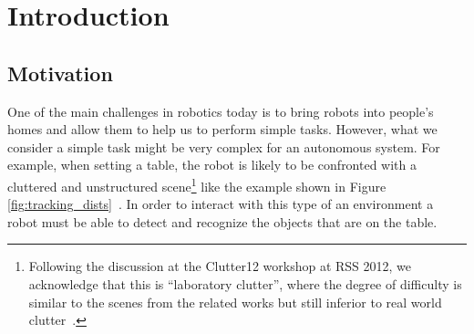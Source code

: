\chapter{Introduction}
\label{chapter:Introduction}


 
\section{Motivation}
\label{sec:intro}
One of the main challenges in robotics today is to bring robots into people's homes and allow them to help us to perform simple tasks. However, what we consider a simple task might be very complex for an autonomous system. For example, when setting a table, the robot is likely to be
confronted with a cluttered and unstructured scene\footnote{Following the discussion at the Clutter12
workshop at RSS 2012, we acknowledge that this is ``laboratory clutter'', where the degree of difficulty
is similar to the scenes from the related works but still inferior to real world clutter~\cite{matei2010manipulation}.} like the example shown
in Figure \ref{fig:tracking_dists}~\cite{iros10kcopman}. In order to interact with this type of an environment a robot must be able to detect and recognize the objects that are on the table.

